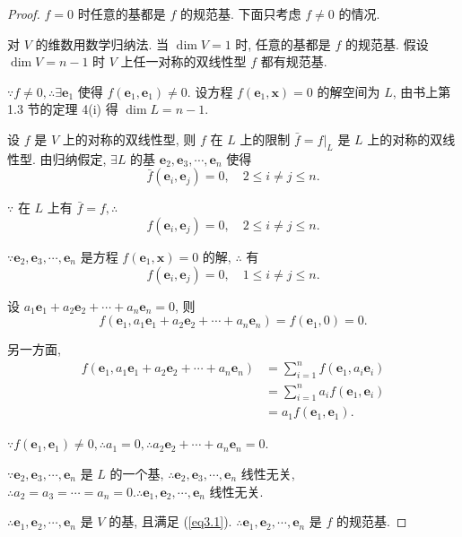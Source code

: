 \documentclass{ctexart}
\begin{document}
\begin{proof}
    $f=0$ 时任意的基都是 $f$ 的规范基. 下面只考虑 $f\neq0$ 的情况.

    对 $V$ 的维数用数学归纳法. 当 $\dim V=1$ 时, 任意的基都是 $f$ 的规范基. 假设 $\dim V=n-1$ 时 $V$ 上任一对称的双线性型 $f$ 都有规范基.

    $\because f\neq0,\therefore\exists\boldsymbol{e}_1$ 使得 $f(\boldsymbol{e}_1,\boldsymbol{e}_1)\neq0$. 设方程 $f(\boldsymbol{e}_1,\boldsymbol{x})=0$ 的解空间为 $L$, 由书上第 1.3 节的定理 4(i) 得 $\dim L=n-1$.
    
    设 $f$ 是 $V$ 上的对称的双线性型, 则 $f$ 在 $L$ 上的限制 $\bar{f}=f|_L$ 是 $L$ 上的对称的双线性型. 由归纳假定, $\exists L$ 的基 $\boldsymbol{e}_2,\boldsymbol{e}_3,\cdots,\boldsymbol{e}_n$ 使得
    \[\bar{f}(\boldsymbol{e}_i,\boldsymbol{e}_j)=0,\quad2\leq i\neq j\leq n.\]

    $\because$ 在 $L$ 上有 $\bar{f}=f,\therefore$
    \[f(\boldsymbol{e}_i,\boldsymbol{e}_j)=0,\quad2\leq i\neq j\leq n.\]

    $\because\boldsymbol{e}_2,\boldsymbol{e}_3,\cdots,\boldsymbol{e}_n$ 是方程 $f(\boldsymbol{e}_1,\boldsymbol{x})=0$ 的解, $\therefore$ 有
    \begin{equation}\label{eq3.1}
        f(\boldsymbol{e}_i,\boldsymbol{e}_j)=0,\quad1\leq i\neq j\leq n.
    \end{equation}
    
    设 $a_1\boldsymbol{e}_1+a_2\boldsymbol{e}_2+\cdots+a_n\boldsymbol{e}_n=0$, 则
    \[f(\boldsymbol{e}_1,a_1\boldsymbol{e}_1+a_2\boldsymbol{e}_2+\cdots+a_n\boldsymbol{e}_n)=f(\boldsymbol{e}_1,0)=0.\]

    另一方面,
    \begin{align*}
        f(\boldsymbol{e}_1,a_1\boldsymbol{e}_1+a_2\boldsymbol{e}_2+\cdots+a_n\boldsymbol{e}_n) & =\sum\limits_{i=1}^nf(\boldsymbol{e}_1,a_i\boldsymbol{e}_i) \\
        & =\sum\limits_{i=1}^na_if(\boldsymbol{e}_1,\boldsymbol{e}_i) \\
        & =a_1f(\boldsymbol{e}_1,\boldsymbol{e}_1).
    \end{align*}

    $\because f(\boldsymbol{e}_1,\boldsymbol{e}_1)\neq0,\therefore a_1=0,\therefore a_2\boldsymbol{e}_2+\cdots+a_n\boldsymbol{e}_n=0$.

    $\because\boldsymbol{e}_2,\boldsymbol{e}_3,\cdots,\boldsymbol{e}_n$ 是 $L$ 的一个基, $\therefore\boldsymbol{e}_2,\boldsymbol{e}_3,\cdots,\boldsymbol{e}_n$ 线性无关, $\therefore a_2=a_3=\cdots=a_n=0.\therefore\boldsymbol{e}_1,\boldsymbol{e}_2,\cdots,\boldsymbol{e}_n$ 线性无关.

    $\therefore\boldsymbol{e}_1,\boldsymbol{e}_2,\cdots,\boldsymbol{e}_n$ 是 $V$ 的基, 且满足 (\ref{eq3.1}). $\therefore\boldsymbol{e}_1,\boldsymbol{e}_2,\cdots,\boldsymbol{e}_n$ 是 $f$ 的规范基.
\end{proof}
\end{document}
